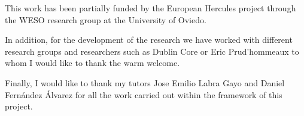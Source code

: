 \begin{acknowledgments}
    This work has been partially funded by the European
    Hercules project through the WESO research group at
    the University of Oviedo.

    In addition, for the development of the research we
    have worked with different research groups and researchers
    such as Dublin Core or Eric Prud'hommeaux to whom I would
    like to thank the warm welcome.

    Finally, I would like to thank my tutors Jose Emilio
    Labra Gayo and Daniel Fernández Álvarez for all the
    work carried out within the framework of this project.

\end{acknowledgments}